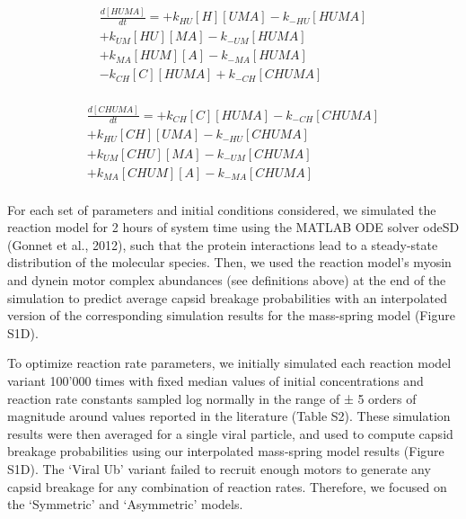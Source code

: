 \begin{equation}
\begin{split}
\frac{d[HUMA]}{dt} =  + k_{HU}[H][UMA] - k_{-HU}[HUMA]    \\%
                      + k_{UM}[HU][MA] - k_{-UM}[HUMA]    \\%
                      + k_{MA}[HUM][A] - k_{-MA}[HUMA]    \\%
                      - k_{CH}[C][HUMA] + k_{-CH}[CHUMA]  \\%
\end{split}
\end{equation}

\begin{equation}
\begin{split}
\frac{d[CHUMA]}{dt} = + k_{CH}[C][HUMA] - k_{-CH}[CHUMA]  \\%
                      + k_{HU}[CH][UMA] - k_{-HU}[CHUMA]  \\%
                      + k_{UM}[CHU][MA] - k_{-UM}[CHUMA]  \\%
                      + k_{MA}[CHUM][A] - k_{-MA}[CHUMA]  \\%
\end{split}
\end{equation}

For each set of parameters and initial conditions considered, we simulated the reaction model for 2 hours of system time using the MATLAB ODE solver odeSD (Gonnet et al., 2012), such that the protein interactions lead to a steady-state distribution of the molecular species. Then, we used the reaction model’s myosin and dynein motor complex abundances (see definitions above) at the end of the simulation to predict average capsid breakage probabilities with an interpolated version of the corresponding simulation results for the mass-spring model (Figure S1D).

To optimize reaction rate parameters, we initially simulated each reaction model variant 100’000 times with fixed median values of initial concentrations and reaction rate constants sampled log normally in the range of ± 5 orders of magnitude around values reported in the literature (Table S2). These simulation results were then averaged for a single viral particle, and used to compute capsid breakage probabilities using our interpolated mass-spring model results (Figure S1D). The ‘Viral Ub’ variant failed to recruit enough motors to generate any capsid breakage for any combination of reaction rates. Therefore, we focused on the ‘Symmetric’ and ‘Asymmetric’ models.

